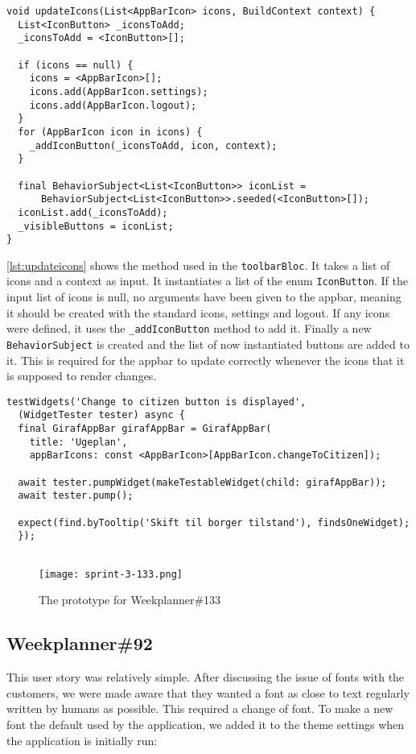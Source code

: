 \begin{lstlisting}[caption={Updating the icons in the appbar},label={lst:updateicons}]
  void updateIcons(List<AppBarIcon> icons, BuildContext context) {
  List<IconButton> _iconsToAdd;
  _iconsToAdd = <IconButton>[];

  if (icons == null) {
    icons = <AppBarIcon>[];
    icons.add(AppBarIcon.settings);
    icons.add(AppBarIcon.logout);
  }
  for (AppBarIcon icon in icons) {
    _addIconButton(_iconsToAdd, icon, context);
  }

  final BehaviorSubject<List<IconButton>> iconList =
      BehaviorSubject<List<IconButton>>.seeded(<IconButton>[]);
  iconList.add(_iconsToAdd);
  _visibleButtons = iconList;
}
\end{lstlisting}
\autoref{lst:updateicons} shows the method used in the \texttt{toolbarBloc}.
It takes a list of icons and a context as input.
It instantiates a list of the enum \texttt{IconButton}.
If the input list of icons is null, no arguments have been given to the appbar, meaning it should be created with the standard icons, settings and logout.
If any icons were defined, it uses the \texttt{\_addIconButton} method to add it.
Finally a new \texttt{BehaviorSubject} is created and the list of now instantiated buttons are added to it.
This is required for the appbar to update correctly whenever the icons that it is supposed to render changes.

\begin{lstlisting}[caption={Testing the appbar with certain icons},label={lst:appbaricontest}]
  testWidgets('Change to citizen button is displayed',
  (WidgetTester tester) async {
  final GirafAppBar girafAppBar = GirafAppBar(
    title: 'Ugeplan',
    appBarIcons: const <AppBarIcon>[AppBarIcon.changeToCitizen]);
  
  await tester.pumpWidget(makeTestableWidget(child: girafAppBar));
  await tester.pump();
  
  expect(find.byTooltip('Skift til borger tilstand'), findsOneWidget);
  });
  
\end{lstlisting}

\begin{figure}[h]
    \centering
    \texttt{[image: sprint-3-133.png]}
    \caption{The prototype for Weekplanner\#133}
    \label{fig:proto-weekplanner133}
  \end{figure}
\subsection{Weekplanner\#92}
This user story was relatively simple.
After discussing the issue of fonts with the customers, we were made aware that they wanted a font as close to text regularly written by humans as possible.
This required a change of font.
To make a new font the default used by the application, we added it to the theme settings when the application is initially run:

